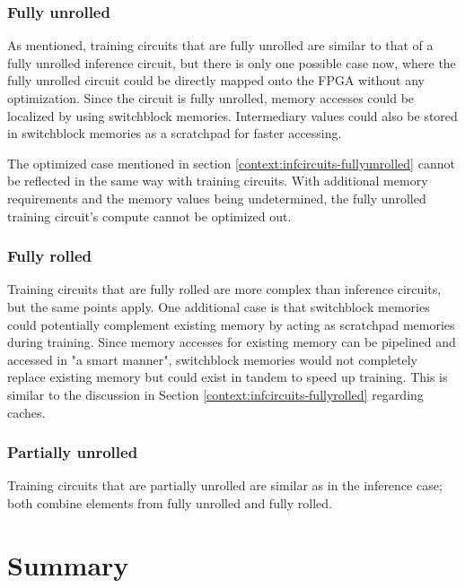 \subsubsection{Fully unrolled}
As mentioned, training circuits that are fully unrolled are similar to that of a fully unrolled inference circuit, but there is only one possible case now, where the fully unrolled circuit could be directly mapped onto the FPGA without any optimization. Since the circuit is fully unrolled, memory accesses could be localized by using switchblock memories. Intermediary values could also be stored in switchblock memories as a scratchpad for faster accessing.

The optimized case mentioned in section \ref{context:infcircuits-fullyunrolled} cannot be reflected in the same way with training circuits. With additional memory requirements and the memory values being undetermined, the fully unrolled training circuit's compute cannot be optimized out.

\subsubsection{Fully rolled}
Training circuits that are fully rolled are more complex than inference circuits, but the same points apply. One additional case is that switchblock memories could potentially complement existing memory by acting as scratchpad memories during training. Since memory accesses for existing memory can be pipelined and accessed in "a smart manner", switchblock memories would not completely replace existing memory but could exist in tandem to speed up training. This is similar to the discussion in Section \ref{context:infcircuits-fullyrolled} regarding caches.

\subsubsection{Partially unrolled}
Training circuits that are partially unrolled are similar as in the inference case; both combine elements from fully unrolled and fully rolled.

\section{Summary}
\label{context:summary}

